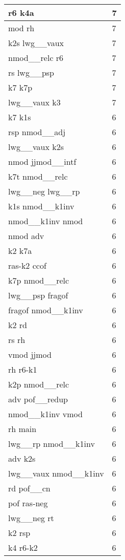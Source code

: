 \documentclass[a4 paper]{article}
\begin{document}
\begin{longtable}{p{}p{}}
r6 k4a  & 7 \\ \midrule
mod rh  & 7 \\ \midrule
k2s lwg\_\_vaux  & 7 \\ \midrule
nmod\_\_relc r6  & 7 \\ \midrule
rs lwg\_\_psp  & 7 \\ \midrule
k7 k7p  & 7 \\ \midrule
lwg\_\_vaux k3  & 7 \\ \midrule
k7 k1s  & 6 \\ \midrule
rsp nmod\_\_adj  & 6 \\ \midrule
lwg\_\_vaux k2s  & 6 \\ \midrule
nmod jjmod\_\_intf  & 6 \\ \midrule
k7t nmod\_\_relc  & 6 \\ \midrule
lwg\_\_neg lwg\_\_rp  & 6 \\ \midrule
k1s nmod\_\_k1inv  & 6 \\ \midrule
nmod\_\_k1inv nmod  & 6 \\ \midrule
nmod adv  & 6 \\ \midrule
k2 k7a  & 6 \\ \midrule
ras-k2 ccof  & 6 \\ \midrule
k7p nmod\_\_relc  & 6 \\ \midrule
lwg\_\_psp fragof  & 6 \\ \midrule
fragof nmod\_\_k1inv  & 6 \\ \midrule
k2 rd  & 6 \\ \midrule
rs rh  & 6 \\ \midrule
vmod jjmod  & 6 \\ \midrule
rh r6-k1  & 6 \\ \midrule
k2p nmod\_\_relc  & 6 \\ \midrule
adv pof\_\_redup  & 6 \\ \midrule
nmod\_\_k1inv vmod  & 6 \\ \midrule
rh main  & 6 \\ \midrule
lwg\_\_rp nmod\_\_k1inv  & 6 \\ \midrule
adv k2s  & 6 \\ \midrule
lwg\_\_vaux nmod\_\_k1inv  & 6 \\ \midrule
rd pof\_\_cn  & 6 \\ \midrule
pof ras-neg  & 6 \\ \midrule
lwg\_\_neg rt  & 6 \\ \midrule
k2 rsp  & 6 \\ \midrule
k4 r6-k2  & 6 \\ \midrule

\end{longtable}
\end{document}
